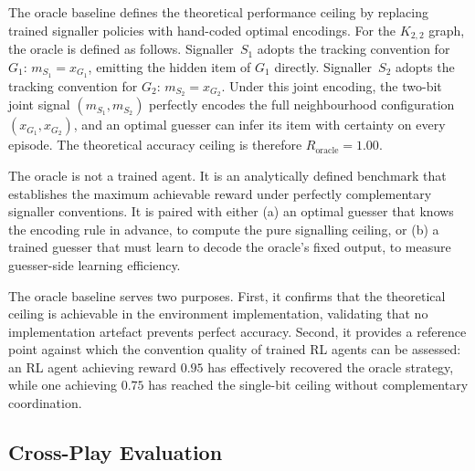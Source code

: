 \documentclass[a4paper,twoside,12pt]{report}
\begin{document}
    The oracle baseline defines the theoretical performance ceiling by
    replacing trained signaller policies with hand-coded optimal encodings.
    For the $K_{2,2}$ graph, the oracle is defined as follows. Signaller~$S_1$
    adopts the tracking convention for $G_1$: $m_{S_1} = x_{G_1}$, emitting
    the hidden item of $G_1$ directly. Signaller~$S_2$ adopts the tracking
    convention for $G_2$: $m_{S_2} = x_{G_2}$. Under this joint encoding, the
    two-bit joint signal $(m_{S_1}, m_{S_2})$ perfectly encodes the full
    neighbourhood configuration $(x_{G_1}, x_{G_2})$, and an optimal guesser
    can infer its item with certainty on every episode. The theoretical
    accuracy ceiling is therefore $R_{\mathrm{oracle}} = 1.00$.
    
    The oracle is not a trained agent. It is an analytically defined benchmark
    that establishes the maximum achievable reward under perfectly complementary
    signaller conventions. It is paired with either (a) an optimal guesser that
    knows the encoding rule in advance, to compute the pure signalling ceiling,
    or (b) a trained guesser that must learn to decode the oracle's fixed
    output, to measure guesser-side learning efficiency.
    
    The oracle baseline serves two purposes. First, it confirms that the
    theoretical ceiling is achievable in the environment implementation,
    validating that no implementation artefact prevents perfect accuracy.
    Second, it provides a reference point against which the convention quality
    of trained RL agents can be assessed: an RL agent achieving reward $0.95$
    has effectively recovered the oracle strategy, while one achieving $0.75$
    has reached the single-bit ceiling without complementary coordination.
    
    
    \subsection{Cross-Play Evaluation}
    \label{sec:baseline-crossplay}
    
\end{document}
